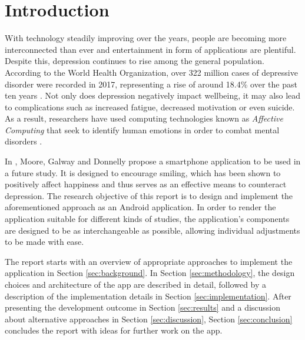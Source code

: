 \section{Introduction} \label{sec:introduction}
With technology steadily improving over the years, people are becoming more interconnected than ever and entertainment in form of applications are plentiful. Despite this, depression continues to rise among the general population.
According to the World Health Organization, over 322 million cases of depressive disorder were recorded in 2017, representing a rise of around 18.4\% over the past ten years \cite{who_depression}.
Not only does depression negatively impact wellbeing, it may also lead to complications such as increased fatigue, decreased motivation or even suicide.
As a result, researchers have used computing technologies known as \textit{Affective Computing} that seek to identify human emotions in order to combat mental disorders \cite{ieee_affective}.

In \cite{sohappy}, Moore, Galway and Donnelly propose a smartphone application to be used in a future study.
It is designed to encourage smiling, which has been shown to positively affect happiness and thus serves as an effective means to counteract depression.
The research objective of this report is to design and implement the aforementioned approach as an Android application.
In order to render the application suitable for different kinds of studies, the application's components are designed to be as interchangeable as possible, allowing individual adjustments to be made with ease.

The report starts with an overview of appropriate approaches to implement the application in Section \ref{sec:background}.
In Section \ref{sec:methodology}, the design choices and architecture of the app are described in detail, followed by a description of the implementation details in Section \ref{sec:implementation}.
After presenting the development outcome in Section \ref{sec:results} and a discussion about alternative approaches in Section \ref{sec:discussion}, Section \ref{sec:conclusion} concludes the report with ideas for further work on the app.

